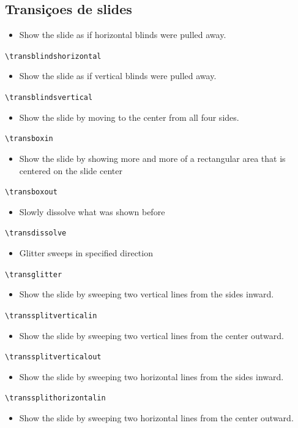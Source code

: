 \documentclass[11pt]{article}
\begin{document}
\subsection{Transiçoes de slides}
\label{sec:org5797550}
\begin{itemize}
\item Show the slide as if horizontal blinds were pulled away.
\end{itemize}
\texttt{\textbackslash{}transblindshorizontal}
\begin{itemize}
\item Show the slide as if vertical blinds were pulled away.
\end{itemize}
\texttt{\textbackslash{}transblindsvertical}
\begin{itemize}
\item Show the slide by moving to the center from all four sides.
\end{itemize}
\texttt{\textbackslash{}transboxin}
\begin{itemize}
\item Show the slide by showing more and more of a rectangular area that is centered on the slide center
\end{itemize}
\texttt{\textbackslash{}transboxout}
\begin{itemize}
\item Slowly dissolve what was shown before
\end{itemize}
\texttt{\textbackslash{}transdissolve}
\begin{itemize}
\item Glitter sweeps in specified direction
\end{itemize}
\texttt{\textbackslash{}transglitter}
\begin{itemize}
\item Show the slide by sweeping two vertical lines from the sides inward.
\end{itemize}
\texttt{\textbackslash{}transsplitverticalin}
\begin{itemize}
\item Show the slide by sweeping two vertical lines from the center outward.
\end{itemize}
\texttt{\textbackslash{}transsplitverticalout}
\begin{itemize}
\item Show the slide by sweeping two horizontal lines from the sides inward.
\end{itemize}
\texttt{\textbackslash{}transsplithorizontalin}
\begin{itemize}
\item Show the slide by sweeping two horizontal lines from the center outward.
\end{itemize}
\end{document}

